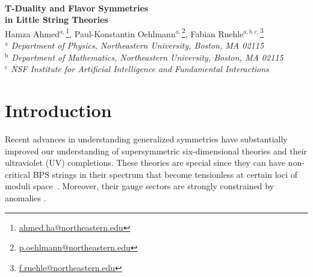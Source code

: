 \documentclass[11pt]{article}
\numberwithin{equation}{section}
\begin{document}
~\vspace{2cm}
\begin{center}
{\huge\bfseries T-Duality and Flavor Symmetries\\[6pt] in Little String Theories}\\[10mm]

Hamza Ahmed$^{a,}$\footnote{\href{mailto:ahmed.ha@northeastern.edu}{ahmed.ha@northeastern.edu}}, Paul-Konstantin Oehlmann$^{a,}$\footnote{\href{mailto:p.oehlmann@northeastern.edu}{p.oehlmann@northeastern.edu}}, Fabian Ruehle$^{a,b,c,}$\footnote{\href{mailto:f.ruehle@northeastern.edu}{f.ruehle@northeastern.edu}} \\[10mm]
\bigskip
{
	{\it ${}^{\text{a}}$ Department of Physics, Northeastern University, Boston, MA 02115}\\[.5em]
	{\it ${}^{\text{b}}$ Department of Mathematics, Northeastern University, Boston, MA 02115}\\[.5em]
	{\it ${}^{\text{c}}$ NSF Institute for Artificial Intelligence and Fundamental Interactions}\\[.5em]
}
\end{center}
\setcounter{footnote}{0} 
\bigskip\bigskip

\begin{abstract}
We explore the T-duality web of 6D Heterotic Little String Theories, focusing on flavor algebra reducing deformations. A careful analysis of the full flavor algebra, including Abelian factors, shows that the flavor rank is preserved under T-duality. This suggests a new T-duality invariant in addition to the Coulomb branch dimension and the two-group structure constants. We also engineer Little String Theories with non-simply laced flavor algebras, whose appearance we attribute to certain discrete 3-form fluxes in M-theory. Geometrically, these theories are engineered in F-theory with non-K\"ahler favorable K3 fibers. This geometric origin leads us to propose that freezing fluxes are preserved across T-duality. Along the way, we discuss various exotic models, including two inequivalent $\text{Spin(32)}/\mathbb{Z}_2$ models that are dual to the same $\text{E}_8 \times \text{E}_8$ theory, and a family of self-T-dual models. 
\end{abstract}

\clearpage
\tableofcontents

\section{Introduction}   
Recent advances in understanding generalized symmetries have substantially improved our understanding of supersymmetric six-dimensional theories and their ultraviolet (UV) completions. These theories are special since they can have non-critical BPS strings in their spectrum that become tensionless at certain loci of moduli space~\cite{Witten:1995ex,Seiberg:1996vs}. Moreover, their gauge sectors are strongly constrained by anomalies \cite{Green:1984bx,Sagnotti:1992qw}. 
\end{document}
